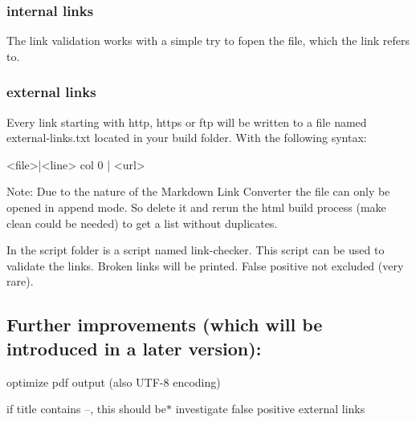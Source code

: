 \subsubsection*{internal links}

The link validation works with a simple try to {\ttfamily fopen} the file, which the link refers to.

\subsubsection*{external links}

Every link starting with {\ttfamily http}, {\ttfamily https} or {\ttfamily ftp} will be written to a file named {\ttfamily external-\/links.\+txt} located in your build folder. With the following syntax\+: \begin{DoxyVerb}    <file>|<line> col 0 | <url>
\end{DoxyVerb}


Note\+: Due to the nature of the Markdown Link Converter the file can only be opened in append mode. So delete it and rerun the html build process ({\ttfamily make clean} could be needed) to get a list without duplicates.

In the script folder is a script named {\ttfamily link-\/checker}. This script can be used to validate the links. Broken links will be printed. False positive not excluded (very rare).

\subsection*{Further improvements (which will be introduced in a later version)\+:}


\begin{DoxyItemize}
\item optimize pdf output (also U\+T\+F-\/8 encoding)
\item if title contains --, this should be$\ast$ investigate false positive external links 
\end{DoxyItemize}
